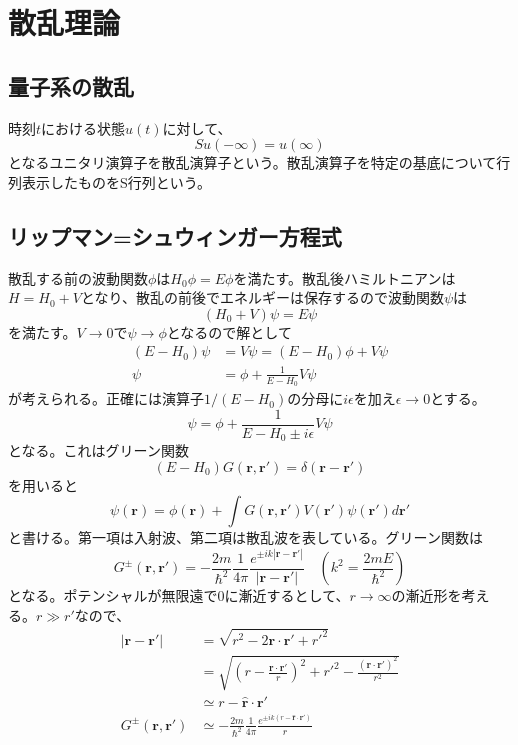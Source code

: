 \section{散乱理論}

\subsection{量子系の散乱}
    時刻$t$における状態$u(t)$に対して、
        \[Su(-\infty) = u(\infty)\]
    となるユニタリ演算子を散乱演算子という。散乱演算子を特定の基底について行列表示したものをS行列という。

\subsection{リップマン=シュウィンガー方程式}
    散乱する前の波動関数$\phi$は$H_0\phi = E\phi$を満たす。散乱後ハミルトニアンは$H = H_0 + V$となり、散乱の前後でエネルギーは保存するので波動関数$\psi$は
        \[(H_0 + V)\psi = E\psi\]
    を満たす。$V \to 0$で$\psi \to \phi$となるので解として
    \begin{align*}
        (E - H_0)\psi &= V\psi = (E - H_0)\phi + V\psi\\
        \psi &= \phi + \frac{1}{E - H_0}V\psi
    \end{align*}
    が考えられる。正確には演算子$1 / (E - H_0)$の分母に$i\epsilon$を加え$\epsilon \to 0$とする。
        \[\psi = \phi + \frac{1}{E - H_0 \pm i\epsilon}V\psi\]
    となる。これはグリーン関数
        \[(E - H_0)G(\bm{r}, \bm{r'}) = \delta(\bm{r} - \bm{r'})\]
    を用いると
        \[\psi(\bm{r}) = \phi(\bm{r}) + \int G(\bm{r}, \bm{r'})V(\bm{r'})\psi(\bm{r'}) d\bm{r'}\]
    と書ける。第一項は入射波、第二項は散乱波を表している。グリーン関数は
        \[G^\pm(\bm{r}, \bm{r'}) = -\frac{2m}{\hbar^2}\frac{1}{4\pi}\frac{e^{\pm ik|\bm{r} - \bm{r'}|}}{|\bm{r} - \bm{r'}|} \quad \left(k^2 = \frac{2mE}{\hbar^2}\right)\]
    となる。ポテンシャルが無限遠で0に漸近するとして、$r \to \infty$の漸近形を考える。$r \gg r'$なので、
    \begin{align*}
        |\bm{r} - \bm{r'}|
            &= \sqrt{r^2 - 2\bm{r} \cdot \bm{r'} + r'^2}\\
            &= \sqrt{\left(r - \frac{\bm{r} \cdot \bm{r'}}{r}\right)^2 + r'^2 - \frac{(\bm{r} \cdot \bm{r'})^2}{r^2}}\\
            &\simeq r - \bm{\hat{r}} \cdot \bm{r'}\\
        G^\pm(\bm{r}, \bm{r'})
            &\simeq -\frac{2m}{\hbar^2}\frac{1}{4\pi}\frac{e^{\pm ik(r - \bm{\hat{r}} \cdot \bm{r'})}}{r}
    \end{align*}
